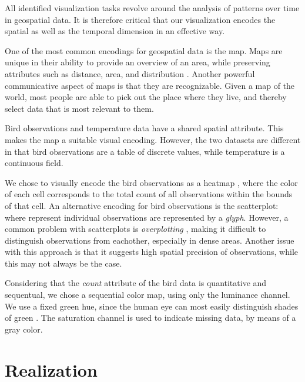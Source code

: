 \documentclass[journal]{vgtc}                %
\begin{document}

All identified visualization tasks revolve around the analysis of patterns over time in geospatial data. It is therefore critical that our visualization encodes the spatial as well as the temporal dimension in an effective way.

One of the most common encodings for geospatial data is the map. Maps are unique in their ability to provide an overview of an area, while preserving attributes such as distance, area, and distribution \cite{kraak2020cartography}. Another powerful communicative aspect of maps is that they are recognizable. Given a map of the world, most people are able to pick out the place where they live, and thereby select data that is most relevant to them.

Bird observations and temperature data have a shared spatial attribute. This makes the map a suitable visual encoding. However, the two datasets are different in that bird observations are a table of discrete values, while temperature is a continuous field. 

We chose to visually encode the bird observations as a heatmap \cite{munzner2014visualization}, where the color of each cell corresponds to the total count of all observations within the bounds of that cell. An alternative encoding for bird observations is the scatterplot: where represent individual observations are represented by a \emph{glyph}. However, a common problem with scatterplots is \emph{overplotting} \cite{micallef2017scatter}, making it difficult to distinguish observations from eachother, especially in dense areas. Another issue with this approach is that it suggests high spatial precision of observations, while this may not always be the case.

Considering that the \emph{count} attribute of the bird data is quantitative and sequentual, we chose a sequential color map, using only the luminance channel. We use a fixed green hue, since the human eye can most easily distinguish shades of green \cite{robinson1984fluorescent}. The saturation channel is used to indicate missing data, by means of a gray color.


\section{Realization}
\end{document}
